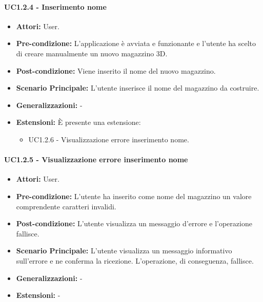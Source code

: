 \paragraph{UC1.2.4 - Inserimento nome}
\begin{itemize}
    \item \textbf{Attori:} User.
    \item \textbf{Pre-condizione:}  L'applicazione è avviata e funzionante e l'utente ha scelto di creare manualmente un nuovo magazzino 3D.
    \item \textbf{Post-condizione:} Viene inserito il nome del nuovo magazzino.
    \item \textbf{Scenario Principale:}  L’utente inserisce il nome del magazzino da costruire.
    \item \textbf{Generalizzazioni:} -
    \item \textbf{Estensioni:} È presente una estensione:
    \begin{itemize}
        \item UC1.2.6 - Visualizzazione errore inserimento nome.
    \end{itemize}
\end{itemize}


\paragraph{UC1.2.5 - Visualizzazione errore inserimento nome}
\begin{itemize}
    \item \textbf{Attori:} User.
    \item \textbf{Pre-condizione:}  L'utente ha inserito come nome del magazzino un valore comprendente caratteri invalidi.
    \item \textbf{Post-condizione:} L'utente visualizza un messaggio d'errore e l'operazione fallisce.
    \item \textbf{Scenario Principale:}  L'utente visualizza un messaggio informativo sull'errore e ne conferma la ricezione. L'operazione, di conseguenza, fallisce.
    \item \textbf{Generalizzazioni:} -
    \item \textbf{Estensioni:} -
\end{itemize}


